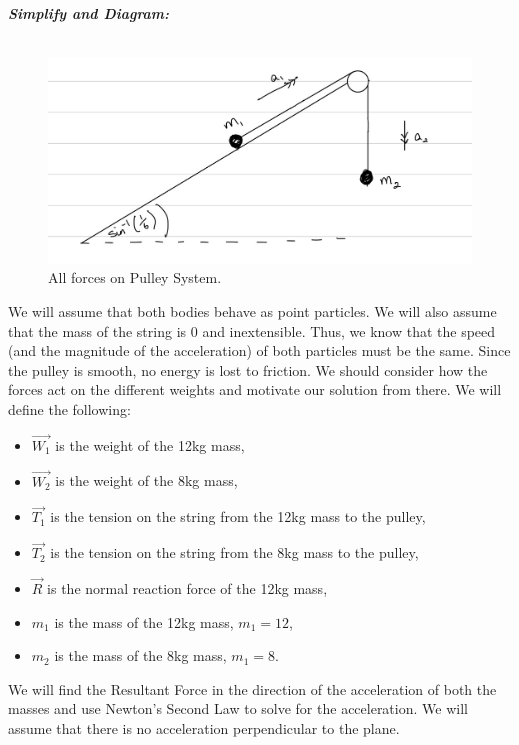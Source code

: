 \begin{subquestions}
\begin{subsubquestions}
	
	\textbf{\textit{Simplify and Diagram:}} \\ \\
	\begin{figure}[H]
		\begin{center}
			\includegraphics[scale=0.25]{../2006/figures/2006q5-1}
			\caption{\label{2006:q5:Diagram1} All forces on Pulley System.}
		\end{center}
	\end{figure}
	We will assume that both bodies behave as point particles. We will also assume that the mass of the string is 0 and inextensible. Thus, we know that the speed (and the magnitude of the acceleration) of both particles must be the same. Since the pulley is smooth, no energy is lost to friction. We should consider how the forces act on the different weights and motivate our solution from there. We will define the following:
	\begin{itemize}
		\item $\vec{W_1}$ is the weight of the 12kg mass,
		\item $\vec{W_2}$ is the weight of the 8kg mass,
		\item $\vec{T_1}$ is the tension on the string from the 12kg mass to the pulley,
		\item $\vec{T_2}$ is the tension on the string from the 8kg mass to the pulley,
		\item $\vec{R}$ is the normal reaction force of the 12kg mass,
		\item $m_1$ is the mass of the 12kg mass, $m_1=12$,
		\item $m_2$ is the mass of the 8kg mass, $m_1=8$.
	\end{itemize}
	We will find the Resultant Force in the direction of the acceleration of both the masses and use Newton's Second Law to solve for the acceleration. We will assume that there is no acceleration perpendicular to the plane.
	

\end{subsubquestions}
\end{subquestions}
